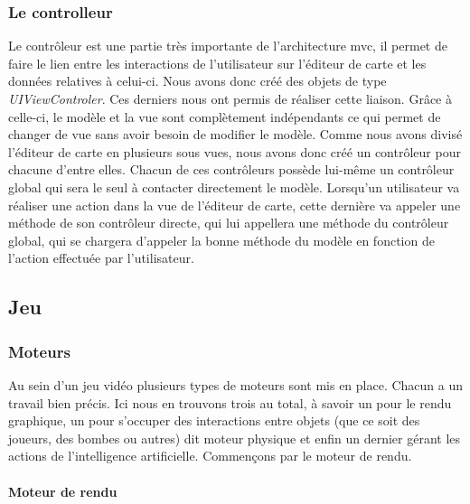 			
	\subsubsection{Le controlleur}
		
		Le contrôleur est une partie très importante de l'architecture \gls{mvc}, il permet de faire le lien entre les interactions de l'utilisateur sur l'éditeur de carte et les données relatives à celui-ci. Nous avons  donc créé des objets de type \textit{UIViewControler}. Ces derniers nous ont permis de réaliser cette liaison. Grâce à celle-ci, le modèle et la vue sont complètement indépendants ce qui permet de changer de vue sans avoir besoin de modifier le modèle. Comme nous avons divisé l'éditeur de carte en plusieurs sous vues, nous avons donc créé un contrôleur pour chacune d'entre elles. Chacun de ces contrôleurs possède lui-même un contrôleur global qui sera le seul à contacter directement le modèle. Lorsqu'un utilisateur va réaliser une action dans la vue de l'éditeur de carte, cette dernière va appeler une méthode de son contrôleur directe, qui lui appellera une méthode du contrôleur global, qui se chargera d'appeler la bonne méthode du modèle en fonction de l'action effectuée par l'utilisateur. 



\subsection{Jeu}

	\subsubsection{Moteurs}
	
		Au sein d'un jeu vidéo plusieurs types de moteurs sont mis en place.
		Chacun a un travail bien précis.
		Ici nous en trouvons trois au total, à savoir un pour le rendu graphique, un
		pour s'occuper des interactions entre objets (que ce soit des joueurs, des bombes ou autres) dit moteur physique et enfin un dernier gérant
		les actions de l'intelligence artificielle.
		Commençons par le moteur de rendu.
	
		\paragraph{Moteur de rendu\\}
		
			\hypertarget{Moteur de rendu}{}
			\label{Moteur de rendu}
		
